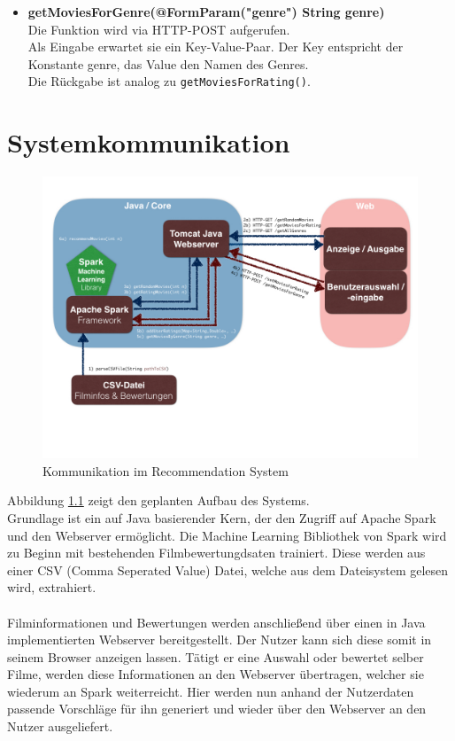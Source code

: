 \begin{itemize}
  \item \textbf{getMoviesForGenre(@FormParam("genre") String genre)}\\
 	Die Funktion wird via HTTP-POST aufgerufen.\\
  	Als Eingabe erwartet sie ein Key-Value-Paar. Der Key entspricht der Konstante \glqq genre\grqq, das Value den Namen des Genres.\\
  	Die Rückgabe ist analog zu \lstinline{getMoviesForRating()}.
  
\end{itemize}





\chapter{Systemkommunikation}
\label{aufbau}
\begin{figure}[htb]
\centering
\includegraphics[scale=0.40]{img/system.jpg} 
\caption{Kommunikation im Recommendation System}
\label{pic:system}
\end{figure}
Abbildung \ref{pic:system} zeigt den geplanten Aufbau des Systems.\\
Grundlage ist ein auf Java basierender Kern, der den Zugriff auf Apache Spark und den Webserver ermöglicht. Die Machine Learning Bibliothek von Spark wird zu Beginn mit bestehenden Filmbewertungdsaten\citep{lit:INET4} trainiert. Diese werden aus einer CSV (Comma Seperated Value) Datei, welche aus dem Dateisystem gelesen wird, extrahiert.\\\\
Filminformationen und Bewertungen werden anschließend über einen in Java implementierten Webserver bereitgestellt. Der Nutzer kann sich diese somit in seinem Browser anzeigen lassen. Tätigt er eine Auswahl oder bewertet selber Filme, werden diese Informationen an den Webserver übertragen, welcher sie wiederum an Spark weiterreicht. Hier werden nun anhand der Nutzerdaten passende Vorschläge für ihn generiert und wieder über den Webserver an den Nutzer ausgeliefert.



